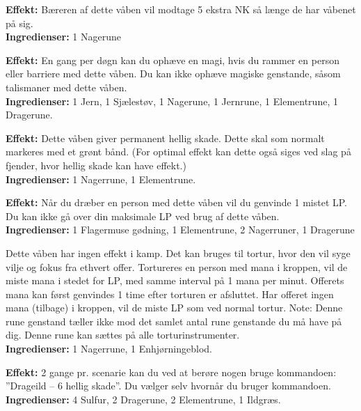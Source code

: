 \begin{runevåben*}
\textbf{Effekt:} Bæreren af dette våben vil modtage 5 ekstra NK så længe de har våbenet på sig.\\
\textbf{Ingredienser:} 1 Nagerune
\end{runevåben*}

\begin{runevåben*}[Heksejægeren]
\textbf{Effekt:} En gang per døgn kan du ophæve en magi, hvis du rammer en person eller barriere med dette våben. Du kan ikke ophæve magiske genstande, såsom talismaner med dette våben.\\
\textbf{Ingredienser:} 1 Jern, 1 Sjælestøv, 1 Nagerune, 1 Jernrune, 1 Elementrune, 1 Dragerune.
\end{runevåben*}

\begin{runevåben*}
\textbf{Effekt:} Dette våben giver permanent hellig skade. Dette skal som normalt markeres med et grønt bånd. (For optimal effekt kan dette også siges ved slag på fjender, hvor hellig skade kan have effekt.)\\
\textbf{Ingredienser:} 1 Nagerrune, 1 Elementrune.
\end{runevåben*}

\begin{runevåben*}[Livets Le]
\textbf{Effekt:} Når du dræber en person med dette våben vil du genvinde 1 mistet LP. Du kan ikke gå over din maksimale LP ved brug af dette våben.\\
\textbf{Ingredienser:} 1 Flagermuse gødning, 1 Elementrune, 2 Nagerruner, 1 Dragerune
\end{runevåben*}

\begin{runevåben*}
Dette våben har ingen effekt i kamp. Det kan bruges til tortur, hvor den vil syge vilje og fokus fra ethvert offer. Tortureres en person med mana i kroppen, vil de miste mana i stedet for LP, med samme interval på 1 mana per minut. Offerets mana kan først genvindes 1 time efter torturen er afsluttet. Har offeret ingen mana (tilbage) i kroppen, vil de miste LP som ved normal tortur.
Note: Denne rune genstand tæller ikke mod det samlet antal rune genstande du må have på dig. Denne rune kan sættes på alle torturinstrumenter.\\
\textbf{Ingredienser:} 1 Nagerrune, 1 Enhjørningeblod.
\end{runevåben*}

\begin{runerustning*}
\textbf{Effekt:} 2 gange pr. scenarie kan du ved at berøre nogen bruge kommandoen: ”Drageild – 6 hellig skade”. Du vælger selv hvornår du bruger kommandoen.\\
\textbf{Ingredienser:} 4 Sulfur, 2 Dragerune, 2 Elementrune, 1 Ildgræs.
\end{runerustning*}

